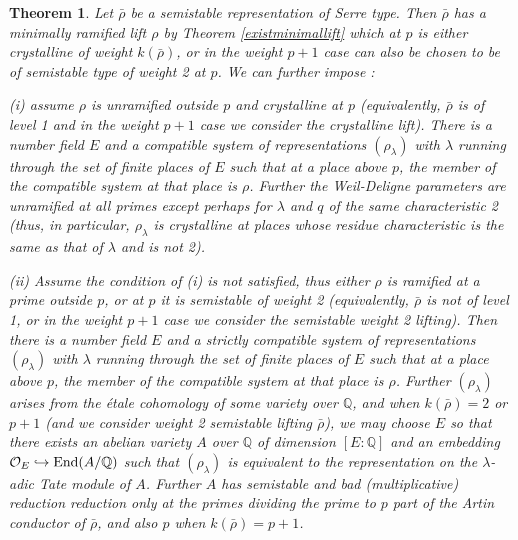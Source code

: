 \documentclass[12pt]{article}
\newcommand{\Q}{\mathbb{Q}}
\newcommand{\rhobar}{\overline{\rho}}
\newtheorem{theorem}{Theorem}[section]
\def\rhobar{ {\bar {\rho} } }
\def\rhob{ {\bar {\rho} } }
\begin{document}
\begin{theorem}\label{minimal} Let $\rhobar$ be a semistable representation
of Serre type. Then $\rhobar$ has a
minimally ramified lift $\rho$ by Theorem \ref{existminimallift} which
at $p$ is either crystalline of weight $k(\rhob)$,
or in the weight $p+1$ case can also be chosen to be of
semistable type of weight 2 at $p$. We can further impose :

(i) assume $\rho$ is unramified outside $p$ and crystalline at $p$
(equivalently, $\rhobar$ is of level 1 and in the weight $p+1$ case we
consider the crystalline lift). There
is a number field $E$ and a
compatible system of representations $(\rho_\lambda)$ with
$\lambda$ running through the  set of finite places of $E$
such that at a place above $p$, the member of the
compatible system at that place is $\rho$. Further the Weil-Deligne
parameters are unramified at all primes except
perhaps for $\lambda$ and $q$ of the same characteristic 2 (thus, in
particular,
$\rho_{\lambda}$
is crystalline at places whose residue characteristic is the same as
that of $\lambda$ and is not 2).

(ii) Assume  the condition of (i) is not satisfied, thus either $\rho$ is
ramified at a prime outside $p$, or at $p$ it is semistable of weight
2 (equivalently, $\rhobar$ is not of level 1, or in the weight $p+1$ case we
consider the semistable weight 2 lifting).  Then there
is a number field $E$ and a strictly
 compatible system of representations $(\rho_\lambda)$ with
$\lambda$ running through the  set of finite places of $E$
such that at a place above $p$, the member of the
compatible system at that place is $\rho$. Further $(\rho_{\lambda})$
arises from the \'etale cohomology of some variety over $\Q$, and when
$k(\rhobar)=2$ or $p+1$ (and we consider weight 2 semistable lifting
$\rhobar$), we may choose $E$ so that there exists an abelian
variety $A$ over $\Q$ of dimension $[E:\Q]$ and an embedding ${\cal
 O}_E \hookrightarrow {\rm End}(A/\Q)$ such that $(\rho_{\lambda})$
is equivalent to the representation on the $\lambda$-adic Tate module
of $A$. Further $A$ has semistable and bad (multiplicative) reduction
reduction only at the primes dividing the prime to $p$ part of the Artin
conductor of $\rhob$, and also $p$ when $k(\rhob)=p+1$.
\end{theorem}
\end{document}
